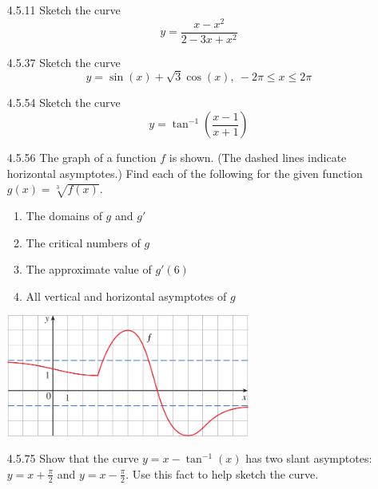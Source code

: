 \documentclass{article}
\begin{document}
\begin{enumerate}
\item[4.5.11]
    Sketch the curve
    \[
        y = \frac{x-x^{2}}{2 - 3x + x^{2}}
    \]

\vspace{6cm}

\item[4.5.37]
    Sketch the curve
    \[
        y = \sin (x) + \sqrt{3} \cos (x),\ -2 \pi \leqslant x \leqslant  2 \pi
    \]

\vspace{6cm}

\item[4.5.54]
    Sketch the curve
    \[
        y = \tan^{-1} \left(\frac{x-1}{x+1}\right)
    \]

\newpage

\item[4.5.56]
    The graph of a function $f$ is shown. (The dashed lines indicate
    horizontal asymptotes.) Find each of the following for the given
    function $g(x) = \sqrt[3]{f(x)}$.

    \begin{enumerate}
        \item The domains of $g$ and $g'$
        \item The critical numbers of $g$
        \item The approximate value of $g'(6)$
        \item All vertical and horizontal asymptotes of $g$
    \end{enumerate}

    \begin{center}
        \includegraphics[width=8cm]{./png/4.5.56.png}
    \end{center}

\vspace{7cm}

\item[4.5.75]
    Show that the curve $y = x - \tan^{-1} (x) $ has two slant asymptotes:
    $y = x + \frac{\pi}{2}$ and $y = x - \frac{\pi}{2}$. Use this fact to help
    sketch the curve.


\end{enumerate}
\end{document}
